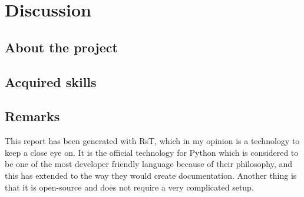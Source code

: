 \chapter{Discussion}

\section{About the project}\label{about-the-project}

\section{Acquired skills}\label{acquired-skills}

\section{Remarks}\label{discussion-remarks}

This report has been generated with RsT, which in my opinion is a
technology to keep a close eye on. It is the official technology for
Python which is considered to be one of the most developer friendly
language because of their philosophy, and this has extended to the way
they would create documentation. Another thing is that it is open-source
and does not require a very complicated setup.
